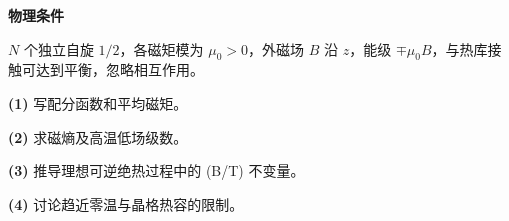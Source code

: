 \textbf{物理条件}\par \(N\) 个独立自旋 \(1/2\)，各磁矩模为 \(\mu_0>0\)，外磁场 \(B\) 沿 \(z\)，能级 \(\mp\mu_0 B\)，与热库接触可达到平衡，忽略相互作用。
\par\noindent\textbf{(1)} 写配分函数和平均磁矩。
\par\noindent\textbf{(2)} 求磁熵及高温低场级数。
\par\noindent\textbf{(3)} 推导理想可逆绝热过程中的 (B/T) 不变量。
\par\noindent\textbf{(4)} 讨论趋近零温与晶格热容的限制。
